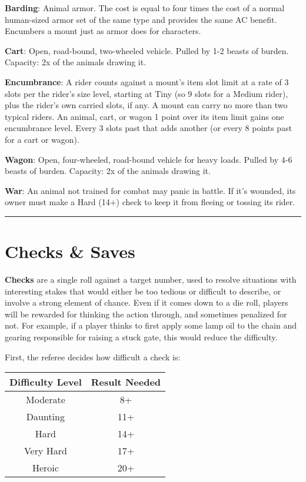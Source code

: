\documentclass{article}
\begin{document}
\begin{multicols}{2}
\textbf{Barding}: Animal armor. The cost is equal to four times the cost
of a normal human-sized armor set of the same type and provides the same
AC benefit. Encumbers a mount just as armor does for characters.

\textbf{Cart}: Open, road-bound, two-wheeled vehicle. Pulled by 1-2
beasts of burden. Capacity: 2x of the animals drawing it.

\textbf{Encumbrance}: A rider counts against a mount's item slot limit
at a rate of 3 slots per the rider's size level, starting at Tiny (so 9
slots for a Medium rider), plus the rider's own carried slots, if any. A
mount can carry no more than two typical riders. An animal, cart, or
wagon 1 point over its item limit gains one encumbrance level. Every 3
slots past that adds another (or every 8 points past for a cart or
wagon).

\textbf{Wagon}: Open, four-wheeled, road-bound vehicle for heavy loads.
Pulled by 4-6 beasts of burden. Capacity: 2x of the animals drawing it.

\textbf{War}: An animal not trained for combat may panic in battle. If
it's wounded, its owner must make a Hard (14+) check to keep it from
fleeing or tossing its rider.

\begin{center}\rule{0.5\linewidth}{0.5pt}\end{center}

\section{Checks \& Saves}\label{checks-saves}

\textbf{Checks} are a single roll against a target number, used to
resolve situations with interesting stakes that would either be too
tedious or difficult to describe, or involve a strong element of chance.
Even if it comes down to a die roll, players will be rewarded for
thinking the action through, and sometimes penalized for not. For
example, if a player thinks to first apply some lamp oil to the chain
and gearing responsible for raising a stuck gate, this would reduce the
difficulty.

First, the referee decides how difficult a check is:

\begin{longtable}[]{@{}cc@{}}
\toprule\noalign{}
Difficulty Level & Result Needed \\
\midrule\noalign{}
\endhead
\bottomrule\noalign{}
\endlastfoot
Moderate & 8+ \\
Daunting & 11+ \\
Hard & 14+ \\
Very Hard & 17+ \\
Heroic & 20+ \\
\end{longtable}


\end{multicols}
\end{document}
